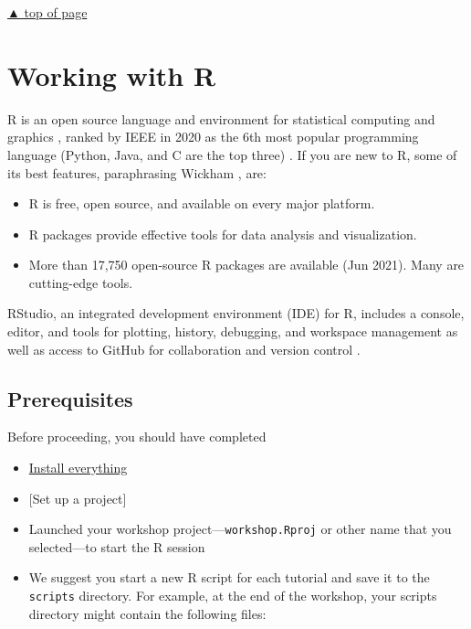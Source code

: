 \documentclass[
]{book}
\providecommand{\tightlist}{%
  \setlength{\itemsep}{0pt}\setlength{\parskip}{0pt}}
\begin{document}
\protect\hyperlink{stories}{▲ top of page}

\hypertarget{work-with-R}{%
\chapter{Working with R}\label{work-with-R}}

R is an open source language and environment for statistical computing and graphics \citep{R-base}, ranked by IEEE in 2020 as the 6th most popular programming language (Python, Java, and C are the top three) \citep{Cass:2020}. If you are new to R, some of its best features, paraphrasing Wickham \citeyearpar{wickham2014advanced}, are:

\begin{itemize}
\tightlist
\item
  R is free, open source, and available on every major platform.
\item
  R packages provide effective tools for data analysis and visualization.
\item
  More than 17,750 open-source R packages are available (Jun 2021). Many are cutting-edge tools.
\end{itemize}

RStudio, an integrated development environment (IDE) for R, includes a console, editor, and tools for plotting, history, debugging, and workspace management as well as access to GitHub for collaboration and version control \citep{2016rstudio}.

\hypertarget{prerequisites}{%
\section{Prerequisites}\label{prerequisites}}

Before proceeding, you should have completed

\begin{itemize}
\tightlist
\item
  \protect\hyperlink{install-everything}{Install everything}\\
\item
  {[}Set up a project{]}\\
\item
  Launched your workshop project---\texttt{workshop.Rproj} or other name that you selected---to start the R session\\
\item
  We suggest you start a new R script for each tutorial and save it to the \texttt{scripts} directory. For example, at the end of the workshop, your scripts directory might contain the following files:
\end{itemize}
\end{document}
